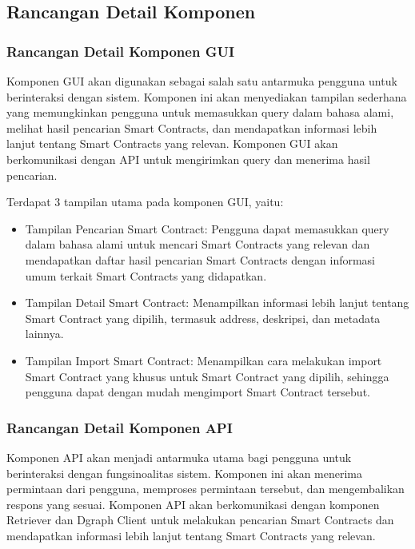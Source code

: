 \subsection{Rancangan Detail Komponen}

\subsubsection{Rancangan Detail Komponen GUI}

Komponen GUI akan digunakan sebagai salah satu antarmuka pengguna untuk berinteraksi dengan sistem. Komponen ini akan menyediakan tampilan sederhana yang memungkinkan pengguna untuk memasukkan query dalam bahasa alami, melihat hasil pencarian Smart Contracts, dan mendapatkan informasi lebih lanjut tentang Smart Contracts yang relevan. Komponen GUI akan berkomunikasi dengan API untuk mengirimkan query dan menerima hasil pencarian.

Terdapat 3 tampilan utama pada komponen GUI, yaitu:
\begin{itemize}
	\item Tampilan Pencarian Smart Contract: Pengguna dapat memasukkan query dalam bahasa alami untuk mencari Smart Contracts yang relevan dan mendapatkan daftar hasil pencarian Smart Contracts dengan informasi umum terkait Smart Contracts yang didapatkan.
	\item Tampilan Detail Smart Contract: Menampilkan informasi lebih lanjut tentang Smart Contract yang dipilih, termasuk address, deskripsi, dan metadata lainnya.
	\item Tampilan Import Smart Contract: Menampilkan cara melakukan import Smart Contract yang khusus untuk Smart Contract yang dipilih, sehingga pengguna dapat dengan mudah mengimport Smart Contract tersebut.
\end{itemize}

\subsubsection{Rancangan Detail Komponen API}

Komponen API akan menjadi antarmuka utama bagi pengguna untuk berinteraksi dengan fungsinoalitas sistem. Komponen ini akan menerima permintaan dari pengguna, memproses permintaan tersebut, dan mengembalikan respons yang sesuai. Komponen API akan berkomunikasi dengan komponen Retriever dan Dgraph Client untuk melakukan pencarian Smart Contracts dan mendapatkan informasi lebih lanjut tentang Smart Contracts yang relevan.

